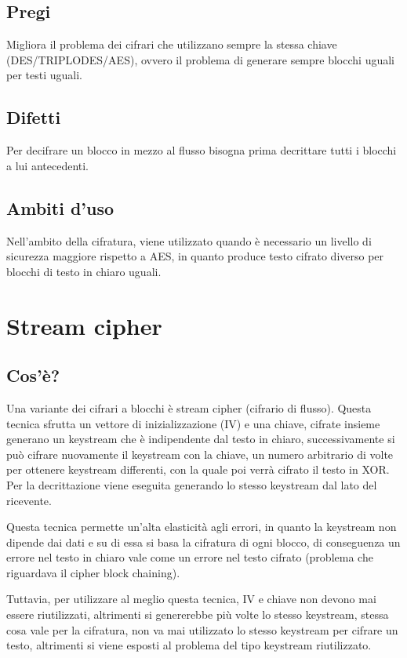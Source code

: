 \subsection{Pregi}
Migliora il problema dei cifrari che utilizzano sempre la stessa chiave (DES/TRIPLODES/AES), ovvero il problema di generare sempre blocchi uguali per testi uguali. 
\subsection{Difetti}
Per decifrare un blocco in mezzo al flusso bisogna prima decrittare tutti i blocchi a lui antecedenti.
\subsection{Ambiti d'uso}
Nell'ambito della cifratura, viene utilizzato quando è necessario un livello di sicurezza maggiore rispetto a AES, in quanto produce testo cifrato diverso per blocchi di testo in chiaro uguali.

\section{Stream cipher}
\subsection{Cos'è?}
Una variante dei cifrari a blocchi è stream cipher (cifrario di flusso).
Questa tecnica sfrutta un vettore di inizializzazione (IV) e una chiave, cifrate insieme generano un keystream che è indipendente dal testo in chiaro, successivamente si può cifrare nuovamente il keystream con la chiave, un numero arbitrario di volte per ottenere keystream differenti, con la quale poi verrà cifrato il testo in XOR.
Per la decrittazione viene eseguita generando lo stesso keystream dal lato del ricevente.

Questa tecnica permette un’alta elasticità agli errori, in quanto la keystream non dipende dai dati e su di essa si basa la cifratura di ogni blocco, di conseguenza un errore nel testo in chiaro vale come un errore nel testo cifrato (problema che riguardava il cipher block chaining).

Tuttavia, per utilizzare al meglio questa tecnica, IV e chiave non devono mai essere riutilizzati, altrimenti si genererebbe più volte lo stesso keystream, stessa cosa vale per la cifratura, non va mai utilizzato lo stesso keystream per cifrare un testo, altrimenti si viene esposti al problema del tipo keystream riutilizzato.

